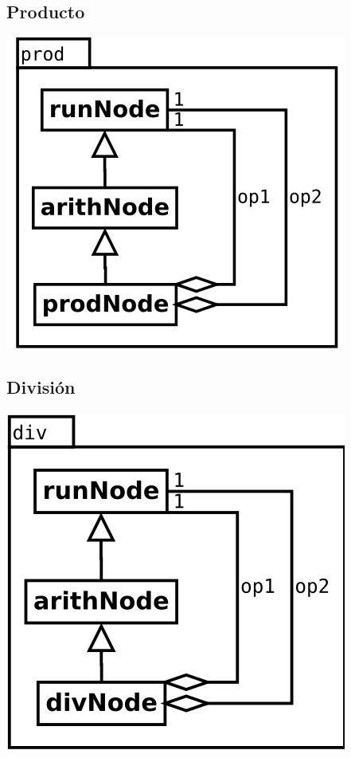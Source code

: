 \subsection {Producto}
\begin{center}
\includegraphics[scale=0.4]{prod.png} \\
\end{center}

\subsection {División}
\begin{center}
\includegraphics[scale=0.4]{div.png} \\
\end{center}

